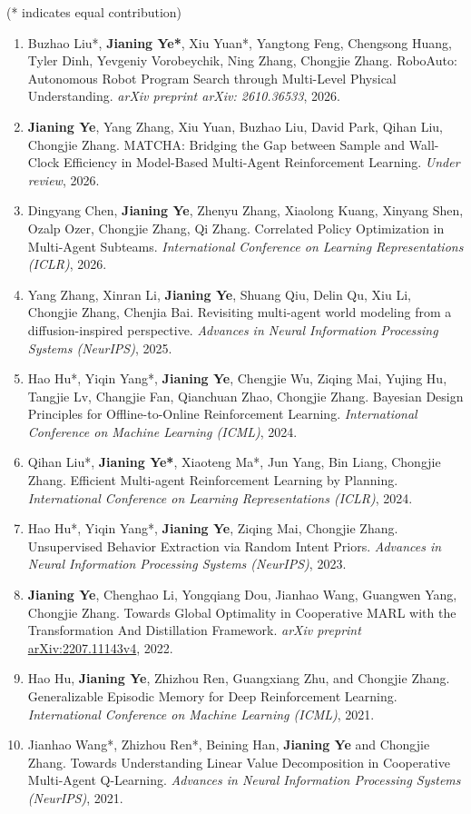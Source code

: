 \documentclass{resume}
\begin{document}
{\small (* indicates equal contribution)}

\begin{enumerate}

  \item Buzhao Liu*, \textbf{Jianing Ye*}, Xiu Yuan*, Yangtong Feng, Chengsong Huang, Tyler Dinh, Yevgeniy Vorobeychik, Ning Zhang, Chongjie Zhang. RoboAuto: Autonomous Robot Program Search through Multi-Level Physical Understanding. \textit{arXiv preprint arXiv: 2610.36533}, 2026.
  \item \textbf{Jianing Ye}, Yang Zhang, Xiu Yuan, Buzhao Liu, David Park, Qihan Liu, Chongjie Zhang. MATCHA: Bridging the Gap between Sample and Wall-Clock Efficiency in Model-Based Multi-Agent Reinforcement Learning. \textit{Under review}, 2026.
  \item Dingyang Chen, \textbf{Jianing Ye}, Zhenyu Zhang, Xiaolong Kuang, Xinyang Shen, Ozalp Ozer, Chongjie Zhang, Qi Zhang. Correlated Policy Optimization in Multi-Agent Subteams. \textit{International Conference on Learning Representations (ICLR)}, 2026.
  \item Yang Zhang, Xinran Li, \textbf{Jianing Ye}, Shuang Qiu, Delin Qu, Xiu Li, Chongjie Zhang, Chenjia Bai. Revisiting multi-agent world modeling from a diffusion-inspired perspective. \textit{Advances in Neural Information Processing Systems (NeurIPS)}, 2025.
  \item Hao Hu*, Yiqin Yang*, \textbf{Jianing Ye}, Chengjie Wu, Ziqing Mai, Yujing Hu, Tangjie Lv, Changjie Fan, Qianchuan Zhao, Chongjie Zhang. Bayesian Design Principles for Offline-to-Online Reinforcement Learning. \textit{International Conference on Machine Learning (ICML)}, 2024.
  \item Qihan Liu*, \textbf{Jianing Ye*}, Xiaoteng Ma*, Jun Yang, Bin Liang, Chongjie Zhang. Efficient Multi-agent Reinforcement Learning by Planning. \textit{International Conference on Learning Representations (ICLR)}, 2024.
  \item Hao Hu*, Yiqin Yang*, \textbf{Jianing Ye}, Ziqing Mai, Chongjie Zhang. Unsupervised Behavior Extraction via Random Intent Priors. \textit{Advances in Neural Information Processing Systems (NeurIPS)}, 2023.
  \item \textbf{Jianing Ye}, Chenghao Li, Yongqiang Dou, Jianhao Wang, Guangwen Yang, Chongjie Zhang. Towards Global Optimality in Cooperative MARL with the Transformation And Distillation Framework. \textit{arXiv preprint} \href{https://arxiv.org/abs/2207.11143v4}{arXiv:2207.11143v4}, 2022.
  \item Hao Hu, \textbf{Jianing Ye}, Zhizhou Ren, Guangxiang Zhu, and Chongjie Zhang. Generalizable Episodic Memory for Deep Reinforcement Learning. \textit{International Conference on Machine Learning (ICML)}, 2021.
  \item Jianhao Wang*, Zhizhou Ren*, Beining Han, \textbf{Jianing Ye} and Chongjie Zhang. Towards Understanding Linear Value Decomposition in Cooperative Multi-Agent Q-Learning. \textit{Advances in Neural Information Processing Systems (NeurIPS)}, 2021.
\end{enumerate}
\end{document}
